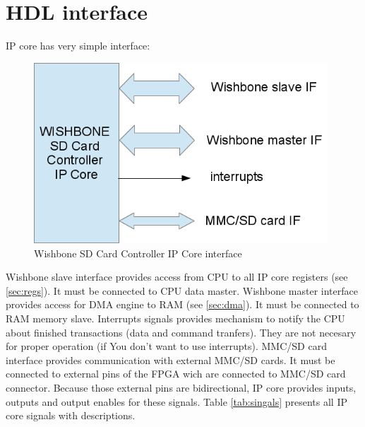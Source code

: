 \section{HDL interface}
\label{sec:hdl_if}

    IP core has very simple interface:
    \begin{figure}[H]
        \centering
        \includegraphics[width=11cm]{../bin/ip_core_if.png}
        \caption{Wishbone SD Card Controller IP Core interface}
        \label{img:ip_core_if}
    \end{figure}
    Wishbone slave interface provides access from CPU to all IP core registers (see \ref{sec:regs}). It must
    be connected to CPU data master. Wishbone master interface provides access for DMA engine to RAM (see \ref{sec:dma}). 
    It must be connected to RAM memory slave. Interrupts signals provides mechanism to notify the CPU about finished transactions (data and command tranfers).
    They are not necesary for proper operation (if You don't want to use interrupts). MMC/SD card interface provides communication with external MMC/SD cards.
    It must be connected to external pins of the FPGA wich are connected to MMC/SD card connector. Because those external pins are bidirectional, IP core
    provides inputs, outputs and output enables for these signals.
    Table \ref{tab:singals} presents all IP core signals with descriptions.
    
